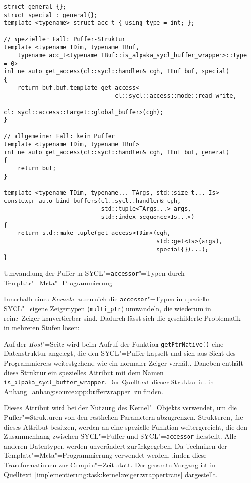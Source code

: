 \begin{code}
    \begin{verbatim}
struct general {};
struct special : general{};
template <typename> struct acc_t { using type = int; };

// spezieller Fall: Puffer-Struktur
template <typename TDim, typename TBuf,
    typename acc_t<typename TBuf::is_alpaka_sycl_buffer_wrapper>::type = 0>
inline auto get_access(cl::sycl::handler& cgh, TBuf buf, special)
{
    return buf.buf.template get_access<
                                cl::sycl::access::mode::read_write,
                                cl::sycl::access::target::global_buffer>(cgh);
}

// allgemeiner Fall: kein Puffer
template <typename TDim, typename TBuf>
inline auto get_access(cl::sycl::handler& cgh, TBuf buf, general)
{
    return buf;
}

template <typename TDim, typename... TArgs, std::size_t... Is>
constexpr auto bind_buffers(cl::sycl::handler& cgh,
                            std::tuple<TArgs...> args,
                            std::index_sequence<Is...>)
{
    return std::make_tuple(get_access<TDim>(cgh,
                                            std::get<Is>(args),
                                            special{})...);
}
    \end{verbatim}
    \caption{Umwandlung der Puffer in SYCL"=\texttt{accessor}"=Typen durch
             Template"=Meta"=Programmierung}
    \label{implementierung:task:kernel:zeiger:wrappertrans}
\end{code}
\vspace{3mm}
Innerhalb eines \textit{Kernels} lassen sich die \texttt{accessor}"=Typen in spezielle
SYCL"=eigene Zeigertypen (\texttt{multi\_ptr}) umwandeln, die wiederum in
\glqq reine\grqq\ Zeiger konvertierbar sind. Dadurch lässt sich die geschilderte
Problematik in mehreren Stufen lösen:

Auf der \textit{Host}"=Seite wird beim Aufruf der Funktion
\texttt{getPtrNative()} eine Datenstruktur angelegt, die den SYCL"=Puffer
kapselt und sich aus Sicht des Programmierers weitestgehend wie ein normaler
Zeiger verhält. Daneben enthält diese Struktur ein spezielles Attribut mit dem
Namen \texttt{is\_alpaka\_sycl\_buffer\_wrapper}. Der Quelltext dieser Struktur
ist in Anhang~\ref{anhang:source:cpp:bufferwrapper} zu finden.

Dieses Attribut wird bei der Nutzung des Kernel"=Objekts verwendet, um die
Puffer"=Strukturen von den restlichen Parametern abzugrenzen. Strukturen, die
dieses Attribut besitzen, werden an eine spezielle Funktion weitergereicht, die
den Zusammenhang zwischen SYCL"=Puffer und SYCL"=\texttt{accessor} herstellt.
Alle anderen Datentypen werden unverändert zurückgegeben. Da Techniken der
Template"=Meta"=Programmierung verwendet werden, finden diese Transformationen
zur Compile"=Zeit statt. Der gesamte Vorgang ist in
Quelltext~\ref{implementierung:task:kernel:zeiger:wrappertrans} dargestellt.

